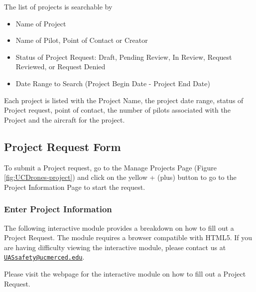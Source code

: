 \documentclass[
  12pt,
]{book}
\providecommand{\tightlist}{%
  \setlength{\itemsep}{0pt}\setlength{\parskip}{0pt}}
\begin{document}
The list of projects is searchable by

\begin{itemize}
\tightlist
\item
  Name of Project
\item
  Name of Pilot, Point of Contact or Creator
\item
  Status of Project Request: Draft, Pending Review, In Review, Request Reviewed, or Request Denied
\item
  Date Range to Search (Project Begin Date - Project End Date)
\end{itemize}

Each project is listed with the Project Name, the project date range, status of Project request, point of contact, the number of pilots associated with the Project and the aircraft for the project.

\subsection{Project Request Form}\label{project-request-form}

To submit a Project request, go to the Manage Projects Page (Figure \ref{fig:UCDrones-project}) and click on the yellow + (plus) button to go to the Project Information Page to start the request.

\subsubsection{Enter Project Information}\label{enter-project-information}

The following interactive module provides a breakdown on how to fill out a Project Request. The module requires a browser compatible with HTML5. If you are having difficulty viewing the interactive module, please contact us at \href{mailto:UASsafety@ucmerced.edu}{\nolinkurl{UASsafety@ucmerced.edu}}.

Please visit the webpage for the interactive module on how to fill out a Project Request.
\end{document}
